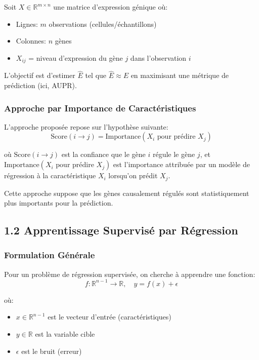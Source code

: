 \documentclass[12pt,a4paper,french]{article}
\begin{document}
Soit $X \in \mathbb{R}^{m \times n}$ une matrice d'expression génique où:
\begin{itemize}
    \item Lignes: $m$ observations (cellules/échantillons)
    \item Colonnes: $n$ gènes
    \item $X_{ij}$ = niveau d'expression du gène $j$ dans l'observation $i$
\end{itemize}

L'objectif est d'estimer $\hat{E}$ tel que $\hat{E} \approx E$ en maximisant une métrique de prédiction (ici, AUPR).

\subsubsection{Approche par Importance de Caractéristiques}

L'approche proposée repose sur l'hypothèse suivante:
\begin{equation}
\text{Score}(i \to j) = \text{Importance}(X_i \text{ pour prédire } X_j)
\end{equation}

où $\text{Score}(i \to j)$ est la confiance que le gène $i$ régule le gène $j$, et $\text{Importance}(X_i \text{ pour prédire } X_j)$ est l'importance attribuée par un modèle de régression à la caractéristique $X_i$ lorsqu'on prédit $X_j$.

Cette approche suppose que les gènes causalement régulés sont statistiquement plus importants pour la prédiction.

\subsection{1.2 Apprentissage Supervisé par Régression}

\subsubsection{Formulation Générale}

Pour un problème de régression supervisée, on cherche à apprendre une fonction:
\begin{equation}
f: \mathbb{R}^{n-1} \to \mathbb{R}, \quad y = f(x) + \epsilon
\end{equation}

où:
\begin{itemize}
    \item $x \in \mathbb{R}^{n-1}$ est le vecteur d'entrée (caractéristiques)
    \item $y \in \mathbb{R}$ est la variable cible
    \item $\epsilon$ est le bruit (erreur)
\end{itemize}
\end{document}
